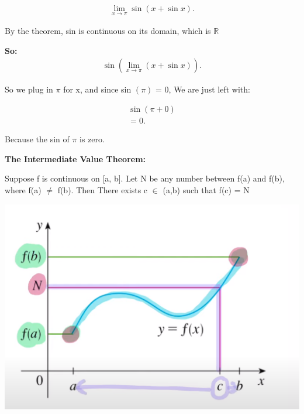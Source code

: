 \documentclass{report}
\begin{document}
        \begin{align*}
            \lim\limits_{x \to \pi}{\sin \left(x+\sin x\right)}
        .\end{align*}

        \bigbreak \noindent 
        By the theorem, sin is continuous on its domain, which is $\mathbb{R}$

        \bigbreak \noindent 
        \textbf{So:}
        \begin{align*}
            \sin \left( \lim\limits_{x \to \pi}{ \left(x + \sin x\right)}\right) 
        .\end{align*}

        \bigbreak \noindent 
        So we plug in $\pi$ for x, and since sin $\left(\pi\right)$ = 0, We are just left with:

        \begin{align*}
            \sin \left(\pi+0\right) \\ 
            = 0 
        .\end{align*}

        \bigbreak \noindent 
        Because the sin of $\pi$ is zero.

        \pagebreak
        \begin{Large}
            \noindent \textbf{The Intermediate Value Theorem:}
        \end{Large}

        \bigbreak \noindent \bigbreak \noindent 
        Suppose f is continuous on [a, b]. Let N be any number between f(a) and f(b), where
        f(a) $\neq$ f(b). Then There exists c $\in$ (a,b) such that f(c) = N

        \bigbreak \noindent \bigbreak \noindent 
        \begin{center}
            \includegraphics[scale=0.7]{../images/8.png}
        \end{center}
\end{document}
